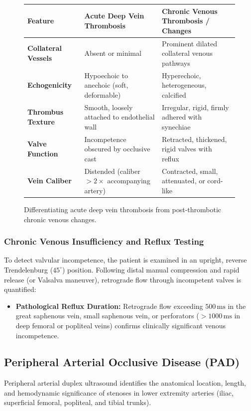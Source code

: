 \documentclass[11pt,a4paper]{article}
\begin{document}
\begin{figure}[htbp]
\centering
\begin{tabular}{lp{6.0cm}p{6.0cm}}
\toprule
\textbf{Feature} & \textbf{Acute Deep Vein Thrombosis} & \textbf{Chronic Venous Thrombosis / Changes} \\
\midrule
\textbf{Collateral Vessels} & Absent or minimal & Prominent dilated collateral venous pathways \\
\textbf{Echogenicity} & Hypoechoic to anechoic (soft, deformable) & Hyperechoic, heterogeneous, calcified \\
\textbf{Thrombus Texture} & Smooth, loosely attached to endothelial wall & Irregular, rigid, firmly adhered with synechiae \\
\textbf{Valve Function} & Incompetence obscured by occlusive cast & Retracted, thickened, rigid valves with reflux \\
\textbf{Vein Caliber} & Distended (caliber $> 2\times$ accompanying artery) & Contracted, small, attenuated, or cord-like \\
\bottomrule
\end{tabular}
\caption{Differentiating acute deep vein thrombosis from post-thrombotic chronic venous changes.}
\label{tab:dvt_differentiation}
\end{figure}

\subsubsection{Chronic Venous Insufficiency and Reflux Testing}
To detect valvular incompetence, the patient is examined in an upright, reverse Trendelenburg ($45^\circ$) position. Following distal manual compression and rapid release (or Valsalva maneuver), retrograde flow through incompetent valves is quantified:
\begin{itemize}[leftmargin=*]
    \item \textbf{Pathological Reflux Duration:} Retrograde flow exceeding $500\,\text{ms}$ in the great saphenous vein, small saphenous vein, or perforators ($> 1000\,\text{ms}$ in deep femoral or popliteal veins) confirms clinically significant venous incompetence.
\end{itemize}

\subsection{Peripheral Arterial Occlusive Disease (PAD)}

Peripheral arterial duplex ultrasound identifies the anatomical location, length, and hemodynamic significance of stenoses in lower extremity arteries (iliac, superficial femoral, popliteal, and tibial trunks).
\end{document}
